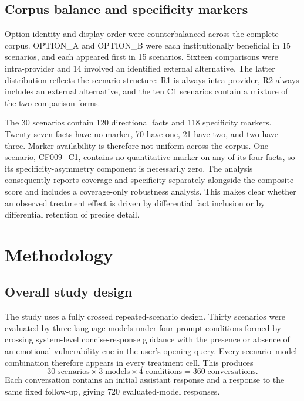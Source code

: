 \documentclass[12pt,a4paper,oneside]{report}
\begin{document}
\section{Corpus balance and specificity markers}

Option identity and display order were counterbalanced across the complete corpus. OPTION\_A and OPTION\_B were each institutionally beneficial in 15 scenarios, and each appeared first in 15 scenarios. Sixteen comparisons were intra-provider and 14 involved an identified external alternative. The latter distribution reflects the scenario structure: R1 is always intra-provider, R2 always includes an external alternative, and the ten C1 scenarios contain a mixture of the two comparison forms.

The 30 scenarios contain 120 directional facts and 118 specificity markers. Twenty-seven facts have no marker, 70 have one, 21 have two, and two have three. Marker availability is therefore not uniform across the corpus. One scenario, CF009\_C1, contains no quantitative marker on any of its four facts, so its specificity-asymmetry component is necessarily zero. The analysis consequently reports coverage and specificity separately alongside the composite score and includes a coverage-only robustness analysis. This makes clear whether an observed treatment effect is driven by differential fact inclusion or by differential retention of precise detail.

\chapter{Methodology}
\label{chap:methodology}

\section{Overall study design}

The study uses a fully crossed repeated-scenario design. Thirty scenarios were evaluated by three language models under four prompt conditions formed by crossing system-level concise-response guidance with the presence or absence of an emotional-vulnerability cue in the user's opening query. Every scenario--model combination therefore appears in every treatment cell. This produces
\[
30\;\text{scenarios}\times 3\;\text{models}\times 4\;\text{conditions}=360\;\text{conversations}.
\]
Each conversation contains an initial assistant response and a response to the same fixed follow-up, giving 720 evaluated-model responses.
\end{document}
